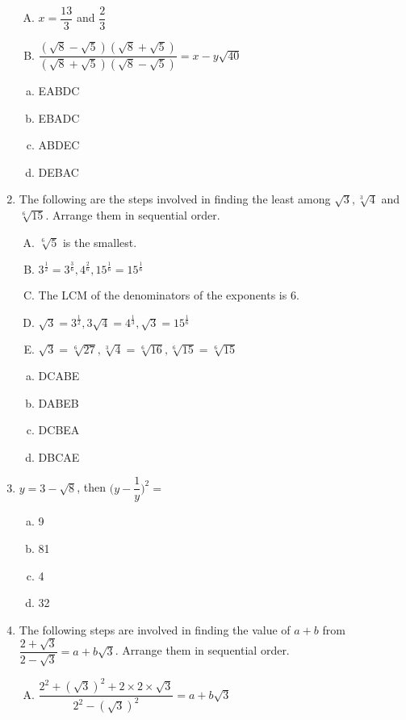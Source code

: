 \begin{multicols}{2}
\begin{enumerate}
\begin{enumerate}[(A)]
\item $x = \dfrac{13}{3}$ and $\dfrac{2}{3}$
\item $\dfrac{(\sqrt{8}-\sqrt{5})(\sqrt{8}+\sqrt{5})}{(\sqrt{8}+\sqrt{5})(\sqrt{8}-\sqrt{5})} = x-y\sqrt{40}$
\end{enumerate}
\begin{enumerate}[(a)]
\item EABDC
\item EBADC
\item ABDEC
\item DEBAC
\end{enumerate}
\item The following are the steps involved in finding the least among $\sqrt{3}, \sqrt[3]{4}$ and $\sqrt[6]{15}$. Arrange them in sequential order.
\begin{enumerate}[(A)]
\item $\sqrt[6]{5}$ is the smallest.
\item $3^\frac{1}{2} = 3^\frac{3}{6}, 4^\frac{2}{6}, 15^\frac{1}{6} = 15^\frac{1}{6}$
\item The LCM of the denominators of the exponents is 6.
\item $\sqrt{3} = 3^\frac{1}{2}, 3\sqrt{4} = 4^\frac{1}{3}, \sqrt{3} = 15^\frac{1}{6}$
\item $\sqrt{3} = \sqrt[6]{27}, \sqrt[3]{4} = \sqrt[6]{16}, \sqrt[6]{15} = \sqrt[6]{15}$
\end{enumerate}
\begin{enumerate}[(a)]
\item DCABE
\item DABEB
\item DCBEA
\item DBCAE
\end{enumerate}
\item $y = 3-\sqrt{8}$, then $\Big(y-\dfrac{1}{y}\Big)^2  = $
\begin{multicols}{2}
\begin{enumerate}[(a)]
\item 9
\item 81
\item 4
\item 32
\end{enumerate}
\end{multicols}
\item The following steps are involved in finding the value of $a+b$ from $\dfrac{2+\sqrt{3}}{2-\sqrt{3}} = a+b\sqrt{3}$. Arrange them in sequential order.
\begin{enumerate}[(A)]
\item $\dfrac{2^2+(\sqrt{3})^2+2\times2\times\sqrt{3}}{2^2-(\sqrt{3})^2} = a+b\sqrt{3}$

\end{enumerate}
\end{enumerate}
\end{multicols}
